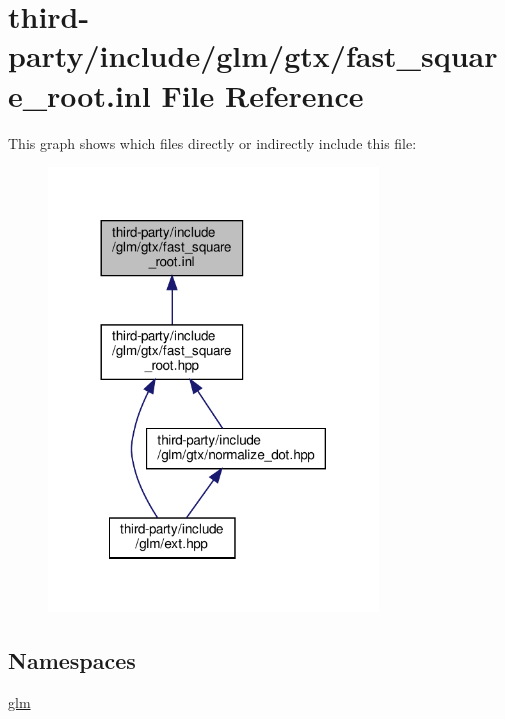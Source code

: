 \hypertarget{fast__square__root_8inl}{}\section{third-\/party/include/glm/gtx/fast\+\_\+square\+\_\+root.inl File Reference}
\label{fast__square__root_8inl}
This graph shows which files directly or indirectly include this file\+:
\nopagebreak
\begin{figure}[H]
\begin{center}
\leavevmode
\includegraphics[width=248pt]{fast__square__root_8inl__dep__incl}
\end{center}
\end{figure}
\subsection*{Namespaces}
\begin{DoxyCompactItemize}
\item 
 \hyperlink{namespaceglm}{glm}
\end{DoxyCompactItemize}

